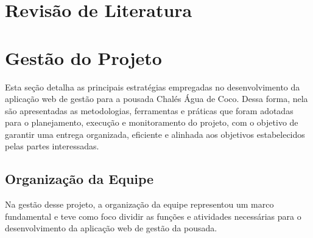 \documentclass[
	12pt,				%
	openany,			%
	twoside,			%
	a4paper,			%
	english,			%
	french,				%
	spanish,			%
	brazil				%
	]{abntex2}
\begin{document}


\chapter{Revisão de Literatura}

\section{}



\chapter{Gestão do Projeto}
Esta seção detalha as principais estratégias empregadas no desenvolvimento da aplicação web de gestão para a pousada Chalés Água de Coco. Dessa forma, nela são apresentadas as metodologias, ferramentas e práticas que foram adotadas para o planejamento, execução e monitoramento do projeto, com o objetivo de garantir uma entrega organizada, eficiente e alinhada aos objetivos estabelecidos pelas partes interessadas.
\section{Organização da Equipe}
Na gestão desse projeto, a organização da equipe representou um marco fundamental e teve como foco dividir as funções e atividades necessárias para o desenvolvimento da aplicação web de gestão da pousada.
\end{document}
